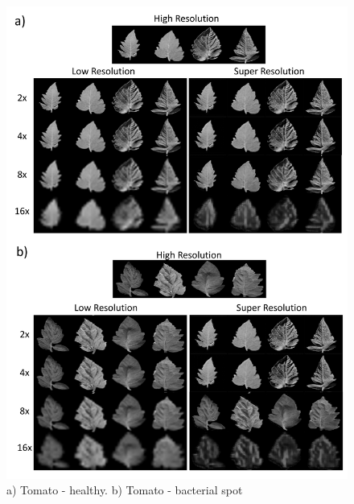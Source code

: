 \documentclass[10pt,twocolumn,letterpaper]{article}
\begin{document}
\begin{figure}[h]
\begin{center}
\includegraphics[scale=0.40]{results/srimages.pdf}
\end{center}
   \caption{a) Tomato - healthy. b) Tomato - bacterial spot}
\label{fig:srimages}
\end{figure}
\end{document}
